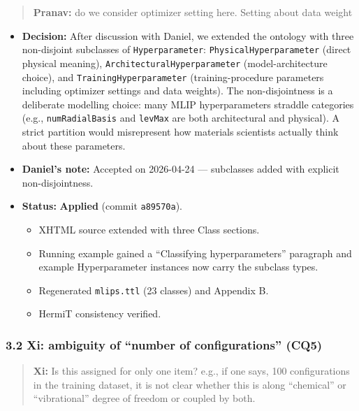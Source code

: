 \begin{quote}
\textbf{Pranav:} do we consider optimizer setting here. Setting about data weight
\end{quote}

\begin{itemize}
\tightlist
\item
  \textbf{Decision:} After discussion with Daniel, we extended the ontology with three non-disjoint subclasses of \texttt{Hyperparameter}: \texttt{PhysicalHyperparameter} (direct physical meaning), \texttt{ArchitecturalHyperparameter} (model-architecture choice), and \texttt{TrainingHyperparameter} (training-procedure parameters including optimizer settings and data weights). The non-disjointness is a deliberate modelling choice: many MLIP hyperparameters straddle categories (e.g., \texttt{numRadialBasis} and \texttt{levMax} are both architectural and physical). A strict partition would misrepresent how materials scientists actually think about these parameters.
\item
  \textbf{Daniel's note:} Accepted on 2026-04-24 --- subclasses added with explicit non-disjointness.
\item
  \textbf{Status:} {\color{green!60!black}\faCheckCircle} \textbf{Applied} (commit \texttt{a89570a}).

  \begin{itemize}
  \tightlist
  \item
    XHTML source extended with three Class sections.
  \item
    Running example gained a ``Classifying hyperparameters'' paragraph and example Hyperparameter instances now carry the subclass types.
  \item
    Regenerated \texttt{mlips.ttl} (23 classes) and Appendix B.
  \item
    HermiT consistency verified.
  \end{itemize}
\end{itemize}

\subsubsection{3.2 Xi: ambiguity of ``number of configurations'' (CQ5)}\label{xi-ambiguity-of-number-of-configurations-cq5}

\begin{quote}
\textbf{Xi:} Is this assigned for only one item? e.g., if one says, 100 configurations in the training dataset, it is not clear whether this is along ``chemical'' or ``vibrational'' degree of freedom or coupled by both.
\end{quote}

